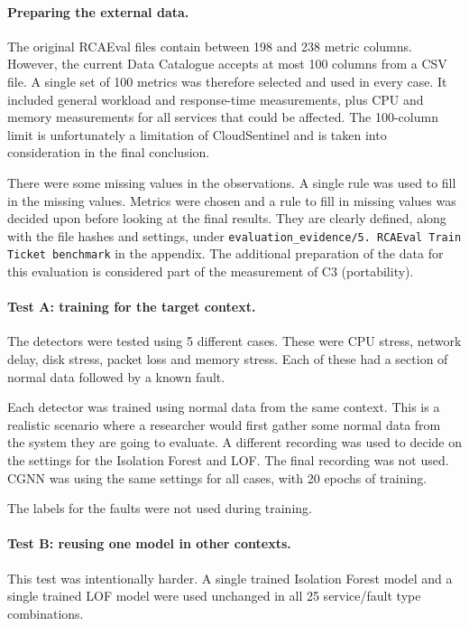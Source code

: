 \paragraph{Preparing the external data.}

The original RCAEval files contain between 198 and 238 metric columns. However, the current Data Catalogue accepts at most 100 columns from a CSV file. A single set of 100 metrics was therefore selected and used in every case. It included general workload and response-time measurements, plus CPU and memory measurements for all services that could be affected. The 100-column limit is unfortunately a limitation of CloudSentinel and is taken into consideration in the final conclusion.

There were some missing values in the observations. A single rule was used to fill in the missing values. Metrics were chosen and a rule to fill in missing values was decided upon before looking at the final results. They are clearly defined, along with the file hashes and settings, under \texttt{evaluation\_evidence/5. RCAEval Train Ticket benchmark} in the appendix. The additional preparation of the data for this evaluation is considered part of the measurement of C3 (portability).

\paragraph{Test A: training for the target context.}

The detectors were tested using 5 different cases. These were CPU stress, network delay, disk stress, packet loss and memory stress. Each of these had a section of normal data followed by a known fault.

Each detector was trained using normal data from the same context. This is a realistic scenario where a researcher would first gather some normal data from the system they are going to evaluate. A different recording was used to decide on the settings for the Isolation Forest and LOF. The final recording was not used. CGNN was using the same settings for all cases, with 20 epochs of training.

The labels for the faults were not used during training.

\paragraph{Test B: reusing one model in other contexts.}

This test was intentionally harder. A single trained Isolation Forest model and a single trained LOF model were used unchanged in all 25 service/fault type combinations.

